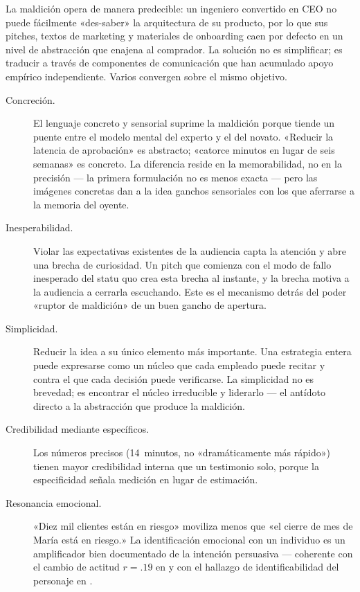 La maldición opera de manera predecible: un ingeniero convertido en CEO no puede fácilmente
«des-saber» la arquitectura de su producto, por lo que sus pitches, textos de marketing y
materiales de onboarding caen por defecto en un nivel de abstracción que enajena al comprador.
La solución no es simplificar; es traducir a través de componentes de comunicación que han
acumulado apoyo empírico independiente. Varios convergen sobre el mismo objetivo.

\begin{description}
  \item[Concreción.] El lenguaje concreto y sensorial suprime la maldición porque tiende un
    puente entre el modelo mental del experto y el del novato. «Reducir la latencia de
    aprobación» es abstracto; «catorce minutos en lugar de seis semanas» es concreto. La
    diferencia reside en la memorabilidad, no en la precisión — la primera formulación no es
    menos exacta — pero las imágenes concretas dan a la idea ganchos sensoriales con los que
    aferrarse a la memoria del oyente.

  \item[Inesperabilidad.] Violar las expectativas existentes de la audiencia capta la atención
    y abre una brecha de curiosidad. Un pitch que comienza con el modo de fallo inesperado
    del statu quo crea esta brecha al instante, y la brecha motiva a la audiencia a cerrarla
    escuchando. Este es el mecanismo detrás del poder «ruptor de maldición» de un buen gancho
    de apertura.

  \item[Simplicidad.] Reducir la idea a su único elemento más importante. Una estrategia
    entera puede expresarse como un núcleo que cada empleado puede recitar y contra el que
    cada decisión puede verificarse. La simplicidad no es brevedad; es encontrar el núcleo
    irreducible y liderarlo — el antídoto directo a la abstracción que produce la maldición.

  \item[Credibilidad mediante específicos.] Los números precisos (\num{14}~minutos, no
    «dramáticamente más rápido») tienen mayor credibilidad interna que un testimonio solo,
    porque la especificidad señala medición en lugar de estimación.

  \item[Resonancia emocional.] «Diez mil clientes están en riesgo» moviliza menos que «el
    cierre de mes de María está en riesgo.» La identificación emocional con un individuo es
    un amplificador bien documentado de la intención persuasiva — coherente con el cambio de
    actitud \(r = .19\) en \textcite{braddock2016narrative} y con el hallazgo de
    identificabilidad del personaje en \textcite{vanlaer2014extended}. %
\end{description}

